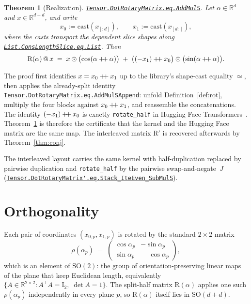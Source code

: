 \documentclass[11pt,a4paper]{article}
\newcommand{\lmod}[1]{\href{http://www.lemma.cn/lean/?module=#1}{\nolinkurl{#1}}}
\newtheorem{theorem}{Theorem}[section]
\newcommand{\R}{\mathbb{R}}
\newcommand{\rot}{\mathrm{R}}
\newcommand{\eye}{\mathrm{I}}
\newcommand{\concat}{\mathbin{+\mkern-4mu+}}
\begin{document}
\begin{theorem}[Realization]
\label{thm:real}
\lmod{Tensor.DotRotaryMatrix.eq.AddMulS}.
Let \(\alpha\in\R^d\) and \(x\in\R^{d+d}\), and write
\[
  x_0 := \mathrm{cast}(x_{[:d]}),\qquad
  x_1 := \mathrm{cast}(x_{[d:]}),
\]
where the casts transport the dependent slice shapes along
\lmod{List.ConsLengthSlice.eq.List}.
Then
\begin{equation}
  \label{eq:real}
  \rot(\alpha)\,@\,x
  \;=\;
  x \odot \bigl(\cos(\alpha\concat\alpha)\bigr)
  \;+\;
  \bigl((-x_1)\concat x_0\bigr) \odot \bigl(\sin(\alpha\concat\alpha)\bigr).
\end{equation}
\end{theorem}

The proof first identifies \(x=x_0\concat x_1\) up to the library's shape-cast equality \(\simeq\), then applies the already-split identity
\lmod{Tensor.DotRotaryMatrix.eq.AddMulSAppend}:
unfold Definition~\ref{def:rot}, multiply the four blocks against \(x_0\concat x_1\), and reassemble the concatenations.
The identity \((-x_1)\concat x_0\) is exactly \texttt{rotate\_half} in Hugging Face Transformers~\cite{huggingface_rope_utils}.
Theorem~\ref{thm:real} is therefore the certificate that the kernel and the Hugging Face matrix are the same map.
The interleaved matrix \(\rot'\) is recovered afterwards by Theorem~\ref{thm:conj}.

The interleaved layout carries the same kernel with half-duplication replaced by pairwise duplication and \texttt{rotate\_half} by the pairwise swap-and-negate~$J$ (\lmod{Tensor.DotRotaryMatrix'.eq.Stack_IteEven_SubMulS}).

\section{Orthogonality}
\label{sec:orth}

Each pair of coordinates \((x_{0,p},x_{1,p})\) is rotated by the standard \(2\times 2\) matrix
\begin{equation}
  \label{eq:so2}
  \rho(\alpha_p)
  \;=\;
  \begin{pmatrix}
    \cos\alpha_p & -\sin\alpha_p \\
    \sin\alpha_p & \phantom{-}\cos\alpha_p
  \end{pmatrix},
\end{equation}
which is an element of \(\mathrm{SO}(2)\): the group of orientation-preserving linear maps of the plane that keep Euclidean length, equivalently
\(\{A\in\R^{2\times 2}:A^\top A=\eye_2,\;\det A=1\}\).
The split-half matrix \(\rot(\alpha)\) applies one such \(\rho(\alpha_p)\) independently in every plane \(p\), so \(\rot(\alpha)\) itself lies in \(\mathrm{SO}(d+d)\).
\end{document}
